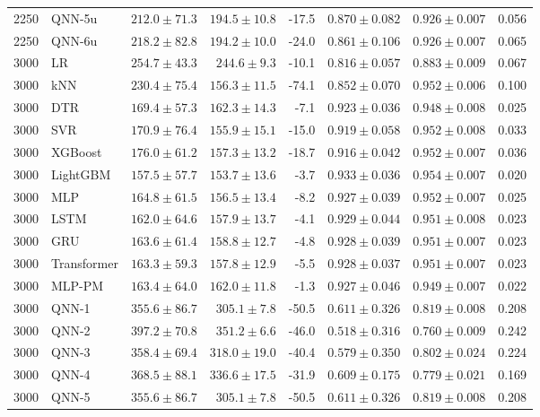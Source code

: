 \begin{longtable}{rlrrrrrr}
2250 & QNN-5u & $212.0 \pm 71.3$ & $194.5 \pm 10.8$ & -17.5 & $0.870 \pm 0.082$ & $0.926 \pm 0.007$ & 0.056 \\
2250 & QNN-6u & $218.2 \pm 82.8$ & $194.2 \pm 10.0$ & -24.0 & $0.861 \pm 0.106$ & $0.926 \pm 0.007$ & 0.065 \\
\midrule
3000 & LR & $254.7 \pm 43.3$ & $244.6 \pm 9.3$ & -10.1 & $0.816 \pm 0.057$ & $0.883 \pm 0.009$ & 0.067 \\
3000 & kNN & $230.4 \pm 75.4$ & $156.3 \pm 11.5$ & -74.1 & $0.852 \pm 0.070$ & $0.952 \pm 0.006$ & 0.100 \\
3000 & DTR & $169.4 \pm 57.3$ & $162.3 \pm 14.3$ & -7.1 & $0.923 \pm 0.036$ & $0.948 \pm 0.008$ & 0.025 \\
3000 & SVR & $170.9 \pm 76.4$ & $155.9 \pm 15.1$ & -15.0 & $0.919 \pm 0.058$ & $0.952 \pm 0.008$ & 0.033 \\
3000 & XGBoost & $176.0 \pm 61.2$ & $157.3 \pm 13.2$ & -18.7 & $0.916 \pm 0.042$ & $0.952 \pm 0.007$ & 0.036 \\
3000 & LightGBM & $157.5 \pm 57.7$ & $153.7 \pm 13.6$ & -3.7 & $0.933 \pm 0.036$ & $0.954 \pm 0.007$ & 0.020 \\
3000 & MLP & $164.8 \pm 61.5$ & $156.5 \pm 13.4$ & -8.2 & $0.927 \pm 0.039$ & $0.952 \pm 0.007$ & 0.025 \\
3000 & LSTM & $162.0 \pm 64.6$ & $157.9 \pm 13.7$ & -4.1 & $0.929 \pm 0.044$ & $0.951 \pm 0.008$ & 0.023 \\
3000 & GRU & $163.6 \pm 61.4$ & $158.8 \pm 12.7$ & -4.8 & $0.928 \pm 0.039$ & $0.951 \pm 0.007$ & 0.023 \\
3000 & Transformer & $163.3 \pm 59.3$ & $157.8 \pm 12.9$ & -5.5 & $0.928 \pm 0.037$ & $0.951 \pm 0.007$ & 0.023 \\
3000 & MLP-PM & $163.4 \pm 64.0$ & $162.0 \pm 11.8$ & -1.3 & $0.927 \pm 0.046$ & $0.949 \pm 0.007$ & 0.022 \\
3000 & QNN-1 & $355.6 \pm 86.7$ & $305.1 \pm 7.8$ & -50.5 & $0.611 \pm 0.326$ & $0.819 \pm 0.008$ & 0.208 \\
3000 & QNN-2 & $397.2 \pm 70.8$ & $351.2 \pm 6.6$ & -46.0 & $0.518 \pm 0.316$ & $0.760 \pm 0.009$ & 0.242 \\
3000 & QNN-3 & $358.4 \pm 69.4$ & $318.0 \pm 19.0$ & -40.4 & $0.579 \pm 0.350$ & $0.802 \pm 0.024$ & 0.224 \\
3000 & QNN-4 & $368.5 \pm 88.1$ & $336.6 \pm 17.5$ & -31.9 & $0.609 \pm 0.175$ & $0.779 \pm 0.021$ & 0.169 \\
3000 & QNN-5 & $355.6 \pm 86.7$ & $305.1 \pm 7.8$ & -50.5 & $0.611 \pm 0.326$ & $0.819 \pm 0.008$ & 0.208 \\

\end{longtable}
